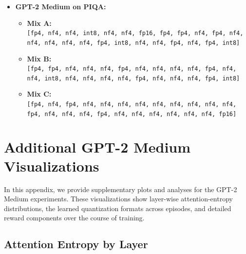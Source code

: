 \documentclass{article}
\begin{document}
{\begin{itemize}
\begin{itemize}
				\item \textbf{Mix B:}\\
				\texttt{[fp4, fp4, nf4, nf4, nf4, fp4, nf4, nf4, nf4, nf4, fp4, nf4, nf4, int8, nf4, nf4, nf4, nf4, fp4, nf4, nf4, nf4, fp4, int8]}
				
				\item \textbf{Mix C:}\\
				\texttt{[fp4, nf4, fp4, nf4, nf4, nf4, nf4, nf4, nf4, nf4, nf4, nf4, fp4, nf4, nf4, nf4, fp4, nf4, nf4, nf4, nf4, nf4, nf4, fp16]}
			\end{itemize}
			\item \textbf{GPT-2 Medium on PIQA:}
			\begin{itemize}
				\item \textbf{Mix A:}\\
				\texttt{[fp4, nf4, nf4, int8, nf4, nf4, fp16, fp4, fp4, nf4, fp4, nf4, nf4, nf4, nf4, nf4, fp4, int8, nf4, nf4, fp4, nf4, fp4, int8]}
				
				\item \textbf{Mix B:}\\
				\texttt{[fp4, fp4, nf4, nf4, nf4, fp4, nf4, nf4, nf4, nf4, fp4, nf4, nf4, int8, nf4, nf4, nf4, nf4, fp4, nf4, nf4, nf4, fp4, int8]}
				
				\item \textbf{Mix C:}\\
				\texttt{[fp4, nf4, fp4, nf4, nf4, nf4, nf4, nf4, nf4, nf4, nf4, nf4, fp4, nf4, nf4, nf4, fp4, nf4, nf4, nf4, nf4, nf4, nf4, fp16]}
			\end{itemize}
		\end{itemize}
		
	} %
	
	\section{Additional GPT-2 Medium Visualizations}
	\label{sec:appendix-b}
	
	In this appendix, we provide supplementary plots and analyses for the GPT-2 Medium experiments. These visualizations show layer-wise attention-entropy distributions, the learned quantization formats across episodes, and detailed reward components over the course of training.
	
	\vspace{0.5em}
	\subsection{Attention Entropy by Layer}
	\label{sec:medium-attn-entropy}
	
\end{document}
